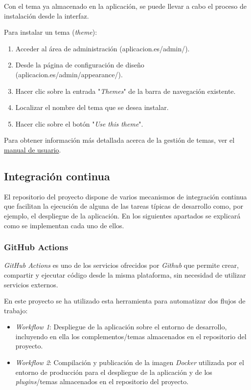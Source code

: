 Con el tema ya almacenado en la aplicación, se puede llevar a cabo el
proceso de instalación desde la interfaz.

Para instalar un tema (\emph{theme}):

\begin{enumerate}
\def\labelenumi{\arabic{enumi}.}
\tightlist
\item
  Acceder al área de administración ({aplicacion.es/admin/}).
\item
  Desde la página de configuración de diseño
  ({aplicacion.es/admin/appearance/}).
\item
  Hacer clic sobre la entrada "\emph{Themes}" de la barra de navegación
  existente.
\item
  Localizar el nombre del tema que se desea instalar.
\item
  Hacer clic sobre el botón "\emph{Use this theme}".
\end{enumerate}

Para obtener información más detallada acerca de la gestión de temas,
ver el
\href{https://tfg-ceniehariadne.readthedocs.io/es/latest/anexos/E_Manual_usuario.html\#manual-de-usuario}{manual
de usuario}.

\subsection{Integración continua}

El repositorio del proyecto dispone de varios mecanismos de integración
continua que facilitan la ejecución de alguna de las tareas típicas de
desarrollo como, por ejemplo, el despliegue de la aplicación. En los
siguientes apartados se explicará como se implementan cada uno de ellos.

\subsubsection{GitHub Actions}

\emph{GitHub Actions} es uno de los servicios ofrecidos por
\emph{Github} que permite crear, compartir y ejecutar código desde la
misma plataforma, sin necesidad de utilizar servicios externos.

En este proyecto se ha utilizado esta herramienta para automatizar dos
flujos de trabajo:

\begin{itemize}
\tightlist
\item
  \emph{Workflow 1}: Despliegue de la aplicación sobre el entorno de
  desarrollo, incluyendo en ella los complementos/temas almacenados en
  el repositorio del proyecto.
\item
  \emph{Workflow 2}: Compilación y publicación de la imagen
  \emph{Docker} utilizada por el entorno de producción para el
  despliegue de la aplicación y de los \emph{plugins}/temas almacenados
  en el repositorio del proyecto.
\end{itemize}

